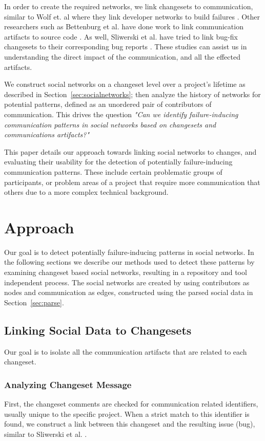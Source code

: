 \documentclass[conference]{IEEEtran}
\begin{document}
In order to create the required networks, we link changesets to communication, similar to Wolf et. al where they link developer networks to build failures \cite{4721184}.  Other researchers such as Bettenburg et al. have done work to link communication artifacts to source code \cite{Bettenburg:2008:ESI:1370750.1370757}.  As well, Sliwerski et al. have tried to link bug-fix changesets to their corresponding bug reports \cite{Sliwerski:2005:CIF:1083142.1083147}.  These studies can assist us in understanding the direct impact of the communication, and all the effected artifacts.  

We construct social networks on a changeset level over a project's lifetime as described in Section~\ref{sec:socialnetworks}; then analyze the history of networks for potential patterns, defined as an unordered pair of contributors of communication.  This drives the question \textit{"Can we identify failure-inducing communication patterns in social networks based on changesets and communications artifacts?"} 

This paper details our approach towards linking social networks to changes, and evaluating their usability for the detection of potentially failure-inducing communication patterns. These include certain problematic groups of participants, or problem areas of a project that require more communication that others due to a more complex technical background.

\section{Approach}
Our goal is to detect potentially failure-inducing patterns in social networks.  In the following sections we describe our methods used to detect these patterns by examining changeset based social networks, resulting in a repository and tool independent process.  The social networks are created by using contributors as nodes and communication as edges, constructed using the parsed social data in  Section~\ref{sec:parse}.

\subsection{Linking Social Data to Changesets}
Our goal is to isolate all the communication artifacts that are related to each changeset.  
\subsubsection{Analyzing Changeset Message}
First, the changeset comments are checked for communication related identifiers, usually unique to the specific project. When a strict match to this identifier is found, we construct a link between this changeset and the resulting issue (bug), similar to Sliwerski et al. \cite{Sliwerski:2005:CIF:1083142.1083147}.
\end{document}
